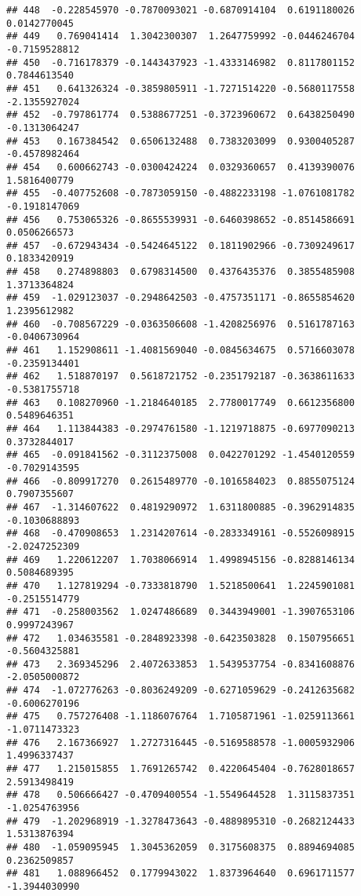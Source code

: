 \documentclass[
]{article}
\begin{document}
\begin{verbatim}
## 448  -0.228545970 -0.7870093021 -0.6870914104  0.6191180026  0.0142770045
## 449   0.769041414  1.3042300307  1.2647759992 -0.0446246704 -0.7159528812
## 450  -0.716178379 -0.1443437923 -1.4333146982  0.8117801152  0.7844613540
## 451   0.641326324 -0.3859805911 -1.7271514220 -0.5680117558 -2.1355927024
## 452  -0.797861774  0.5388677251 -0.3723960672  0.6438250490 -0.1313064247
## 453   0.167384542  0.6506132488  0.7383203099  0.9300405287 -0.4578982464
## 454   0.600662743 -0.0300424224  0.0329360657  0.4139390076  1.5816400779
## 455  -0.407752608 -0.7873059150 -0.4882233198 -1.0761081782 -0.1918147069
## 456   0.753065326 -0.8655539931 -0.6460398652 -0.8514586691  0.0506266573
## 457  -0.672943434 -0.5424645122  0.1811902966 -0.7309249617  0.1833420919
## 458   0.274898803  0.6798314500  0.4376435376  0.3855485908  1.3713364824
## 459  -1.029123037 -0.2948642503 -0.4757351171 -0.8655854620  1.2395612982
## 460  -0.708567229 -0.0363506608 -1.4208256976  0.5161787163 -0.0406730964
## 461   1.152908611 -1.4081569040 -0.0845634675  0.5716603078 -0.2359134401
## 462   1.518870197  0.5618721752 -0.2351792187 -0.3638611633 -0.5381755718
## 463   0.108270960 -1.2184640185  2.7780017749  0.6612356800  0.5489646351
## 464   1.113844383 -0.2974761580 -1.1219718875 -0.6977090213  0.3732844017
## 465  -0.091841562 -0.3112375008  0.0422701292 -1.4540120559 -0.7029143595
## 466  -0.809917270  0.2615489770 -0.1016584023  0.8855075124  0.7907355607
## 467  -1.314607622  0.4819290972  1.6311800885 -0.3962914835 -0.1030688893
## 468  -0.470908653  1.2314207614 -0.2833349161 -0.5526098915 -2.0247252309
## 469   1.220612207  1.7038066914  1.4998945156 -0.8288146134  0.5084689395
## 470   1.127819294 -0.7333818790  1.5218500641  1.2245901081 -0.2515514779
## 471  -0.258003562  1.0247486689  0.3443949001 -1.3907653106  0.9997243967
## 472   1.034635581 -0.2848923398 -0.6423503828  0.1507956651 -0.5604325881
## 473   2.369345296  2.4072633853  1.5439537754 -0.8341608876 -2.0505000872
## 474  -1.072776263 -0.8036249209 -0.6271059629 -0.2412635682 -0.6006270196
## 475   0.757276408 -1.1186076764  1.7105871961 -1.0259113661 -1.0711473323
## 476   2.167366927  1.2727316445 -0.5169588578 -1.0005932906  1.4996337437
## 477   1.215015855  1.7691265742  0.4220645404 -0.7628018657  2.5913498419
## 478   0.506666427 -0.4709400554 -1.5549644528  1.3115837351 -1.0254763956
## 479  -1.202968919 -1.3278473643 -0.4889895310 -0.2682124433  1.5313876394
## 480  -1.059095945  1.3045362059  0.3175608375  0.8894694085  0.2362509857
## 481   1.088966452  0.1779943022  1.8373964640  0.6961711577 -1.3944030990

\end{verbatim}
\end{document}
